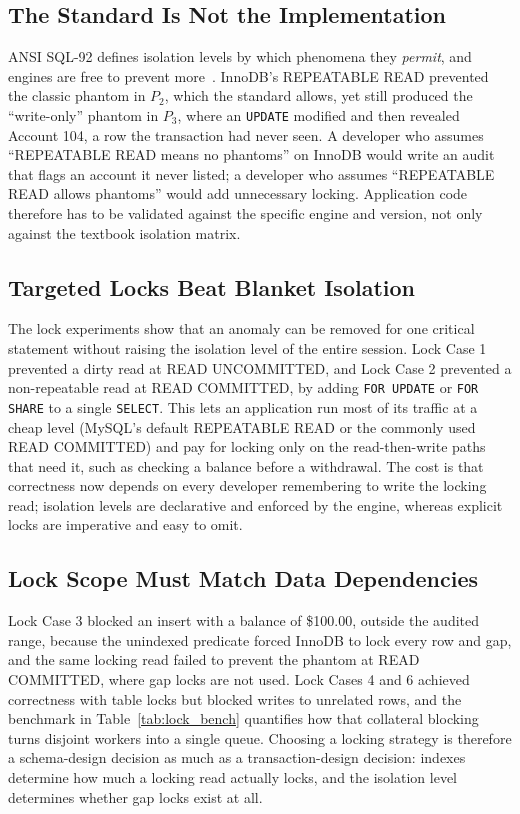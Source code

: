 \documentclass[sigconf, pbalance, nonacm]{acmart}
\begin{document}
\subsection{The Standard Is Not the Implementation}
ANSI SQL-92 defines isolation levels by which phenomena they \emph{permit}, and engines are free to prevent more~\cite{Berenson1995}. InnoDB's REPEATABLE READ prevented the classic phantom in $P_2$, which the standard allows, yet still produced the ``write-only'' phantom in $P_3$, where an \texttt{UPDATE} modified and then revealed Account 104, a row the transaction had never seen. A developer who assumes ``REPEATABLE READ means no phantoms'' on InnoDB would write an audit that flags an account it never listed; a developer who assumes ``REPEATABLE READ allows phantoms'' would add unnecessary locking. Application code therefore has to be validated against the specific engine and version, not only against the textbook isolation matrix.

\subsection{Targeted Locks Beat Blanket Isolation}
The lock experiments show that an anomaly can be removed for one critical statement without raising the isolation level of the entire session. Lock Case 1 prevented a dirty read at READ UNCOMMITTED, and Lock Case 2 prevented a non-repeatable read at READ COMMITTED, by adding \texttt{FOR UPDATE} or \texttt{FOR SHARE} to a single \texttt{SELECT}. This lets an application run most of its traffic at a cheap level (MySQL's default REPEATABLE READ or the commonly used READ COMMITTED) and pay for locking only on the read-then-write paths that need it, such as checking a balance before a withdrawal. The cost is that correctness now depends on every developer remembering to write the locking read; isolation levels are declarative and enforced by the engine, whereas explicit locks are imperative and easy to omit.

\subsection{Lock Scope Must Match Data Dependencies}
Lock Case 3 blocked an insert with a balance of \$100.00, outside the audited range, because the unindexed predicate forced InnoDB to lock every row and gap, and the same locking read failed to prevent the phantom at READ COMMITTED, where gap locks are not used. Lock Cases 4 and 6 achieved correctness with table locks but blocked writes to unrelated rows, and the benchmark in Table~\ref{tab:lock_bench} quantifies how that collateral blocking turns disjoint workers into a single queue. Choosing a locking strategy is therefore a schema-design decision as much as a transaction-design decision: indexes determine how much a locking read actually locks, and the isolation level determines whether gap locks exist at all.
\end{document}

